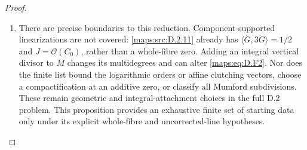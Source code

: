 \begin{proof}
\begin{enumerate}[label=\arabic*.,leftmargin=*]
\item There are precise boundaries to this reduction.
Component-supported linearizations are not covered:
\ref{maps:src:D.2.11} already has $\langle G,3G\rangle=1/2$ and
$J=\mathcal O(C_0)$, rather than a whole-fibre zero.
Adding an integral vertical divisor to $M$ changes its
multidegrees and can alter \eqref{maps:eq:D.F2}.
Nor does the finite list bound the logarithmic orders
or affine clutching vectors, choose a compactification
at an additive zero, or classify all Mumford subdivisions.
These remain geometric and integral-attachment choices
in the full D.2 problem. This proposition provides an
exhaustive finite set of starting data only under its
explicit whole-fibre and uncorrected-line hypotheses.
\end{enumerate}
\end{proof}


